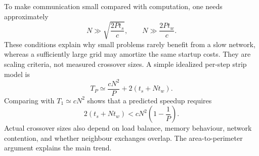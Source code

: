 To make communication small compared with computation, one needs approximately
\[
N\gg\sqrt{\frac{2Pt_s}{c}},\qquad
N\gg\frac{2Pt_w}{c}.
\]
These conditions explain why small problems rarely benefit from a slow network, whereas a
sufficiently large grid may amortize the same startup costs. They are scaling criteria,
not measured crossover sizes. A simple idealized per-step strip model is
\[
T_P\simeq\frac{cN^2}{P}+2(t_s+Nt_w).
\]
Comparing with $T_1\simeq cN^2$ shows that a predicted speedup requires
\[
2(t_s+Nt_w)<cN^2\left(1-\frac1P\right).
\]
Actual crossover sizes also depend on load balance, memory behaviour, network contention,
and whether neighbour exchanges overlap. The area-to-perimeter argument explains the main trend.
